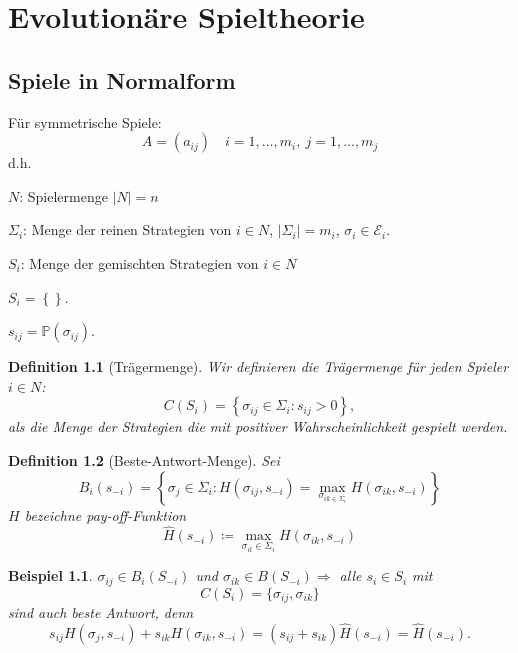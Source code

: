 \documentclass[12pt]{extreport} %
\theoremstyle{named}
\theoremstyle{itshape}
\newtheorem*{definition}{Definition}
\theoremstyle{normal}
\newtheorem*{beispiel*}{Beispiel}
\begin{document}
\chapter{Evolutionäre Spieltheorie}

  
\section{Spiele in Normalform}
Für symmetrische Spiele:
$$ A = \left( a_{ij} \right) \quad i = 1, \dotsc, m_{i}, ~ j = 1, \dotsc, m_{j} $$
d.h.
\begin{description}
	\item $N$: Spielermenge $|N| = n$
	\item $\Sigma_{i}$: Menge der reinen Strategien von $i \in N$, $\left| \Sigma_{i} \right| = m_{i}$, $\sigma_{i} \in \mathcal{E}_{i}$.
	\item $S_{i}$: Menge der gemischten Strategien von $i \in N$
		\begin{description}
			\item $S_{i} = \left\{ \right\}$.
			\item $s_{ij} = \mathds{P}(\sigma_{ij})$.
		\end{description}
\end{description}
  
\begin{definition}[Trägermenge] Wir definieren die Trägermenge für jeden Spieler $i \in N$:
	$$ C(S_{i}) = \left\{ \sigma_{ij} \in \Sigma_{i} : s_{ij} > 0 \right\}, $$
	als die Menge der Strategien die mit positiver Wahrscheinlichkeit gespielt werden.
\end{definition}  

\begin{definition}[Beste-Antwort-Menge] Sei
	$$ B_{i}(s_{-i}) = \left\{ \sigma_{j} \in \Sigma_{i} : H(\sigma_{ij}, s_{-i}) = \max_{\sigma_{ik \in \Sigma_{i}}} H(\sigma_{ik}, s_{-i}) \right\} $$ 
	$H$ bezeichne pay-off-Funktion ~\\
	$$ \hat{H}(s_{-i}) \coloneqq \max_{\sigma_{il} \in \Sigma_{i}} H(\sigma_{ik}, s_{-i}) $$
\end{definition}
  
  
\begin{beispiel*}
	$\sigma_{ij} \in B_{i}(S_{-i})$ und $\sigma_{ik} \in B(S_{-i}) \Rightarrow$ alle $s_{i} \in S_{i}$ mit
	$$ C(S_{i}) = \{ \sigma_{ij}, \sigma_{ik} \} $$	
	sind auch beste Antwort, denn
	$$ s_{ij} H(\sigma_{j}, s_{-i}) + s_{ik} H(\sigma_{ik}, s_{-i}) = (s_{ij} + s_{ik}) \hat{H}(s_{-i}) = \hat{H}(s_{-i}). $$
\end{beispiel*}
\end{document}
